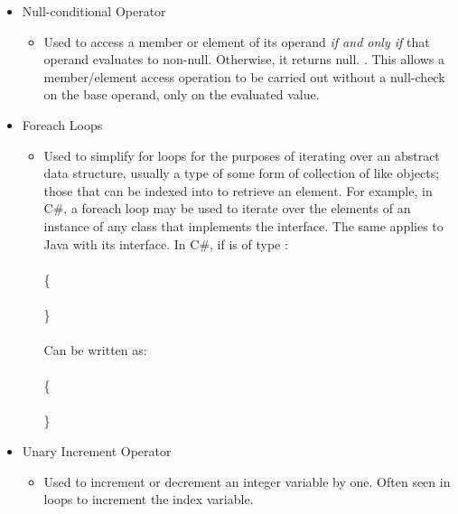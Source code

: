 \documentclass{article}
\begin{document}
\begin{itemize}
\begin{itemize}
                \end{itemize}
            \item Null-conditional Operator
                \begin{itemize}
                    \item Used to access a member or element of its operand \emph{if and only if} that operand evaluates to non-null. Otherwise, it returns null. \citep{cs6Spec}. This allows a member/element access operation to be carried out without a null-check on the base operand, only on the evaluated value.
                \end{itemize}
             \item Foreach Loops
                \begin{itemize}
                    \item Used to simplify for loops for the purposes of iterating over an abstract data structure, usually a type of some form of collection of like objects; those that can be indexed into to retrieve an element. For example, in C\#, a foreach loop may be used to iterate over the elements of an instance of any class that implements the  interface. The same applies to Java with its  interface. In C\#, if  is of type :
                    \\
                    \\
                    \{\\
                    \hspace*{1cm}\\
                    \}
                    \\\\
                    Can be written as:\\
                    \\
                    \{\\
                    \hspace*{1cm}\\
                    \}
                \end{itemize}
            \item Unary Increment Operator
                \begin{itemize}
                    \item Used to increment or decrement an integer variable by one. Often seen in  loops to increment the index variable.

\end{itemize}
\end{itemize}
\end{document}
